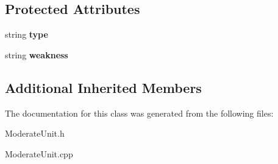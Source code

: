 \subsection*{Protected Attributes}
\begin{DoxyCompactItemize}
\item 
\hypertarget{class_moderate_unit_ab703fcea9a80c008dd7c9db4cef239cd}{}string {\bfseries type}\label{class_moderate_unit_ab703fcea9a80c008dd7c9db4cef239cd}

\item 
\hypertarget{class_moderate_unit_a6986d68b88dda21f3f98074fa0727ee3}{}string {\bfseries weakness}\label{class_moderate_unit_a6986d68b88dda21f3f98074fa0727ee3}

\end{DoxyCompactItemize}
\subsection*{Additional Inherited Members}


The documentation for this class was generated from the following files\+:\begin{DoxyCompactItemize}
\item 
Moderate\+Unit.\+h\item 
Moderate\+Unit.\+cpp\end{DoxyCompactItemize}
